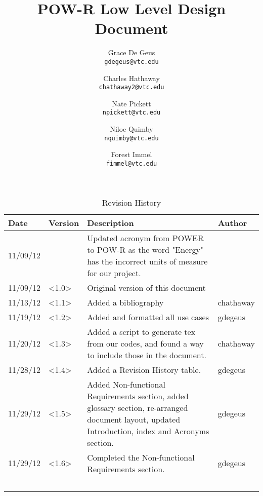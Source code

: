 \documentclass[titlepage]{report}
\begin{document}
\title{POW-R Low Level Design Document}
\author{
  Grace De Geus\\
  \texttt{gdegeus@vtc.edu}
  \and
  Charles Hathaway\\
  \texttt{chathaway2@vtc.edu}
  \and
  Nate Pickett\\
  \texttt{npickett@vtc.edu}
  \and
  Niloc Quimby\\
  \texttt{nquimby@vtc.edu}
  \and
  Forest Immel\\
  \texttt{fimmel@vtc.edu}
}
\maketitle



\setcounter{page}{1}


\begin{table}
\caption{Revision History}
    \begin{tabular}{|p{50pt}|p{50pt}|p{200pt}|p{50pt}|}
	\hline
	Date & Version & Description & Author\\  \hline
	11/09/12 & ~         &  Updated acronym from POWER to POW-R as the word "Energy" has the incorrect units of measure for our project. & ~      \\  \hline
	11/09/12 & <1.0> & Original version of this document & \\  \hline
	11/13/12 & <1.1> & Added a bibliography & chathaway\\  \hline
	11/19/12 & <1.2> & Added and formatted all use cases & gdegeus\\  \hline
	11/20/12 & <1.3> & Added a script to generate tex from our codes, and found a way to include those in the document. & chathaway\\  \hline
	11/28/12 & <1.4> & Added a Revision History table. & gdegeus \\ \hline
	11/29/12 & <1.5> & Added Non-functional Requirements section, added glossary section, re-arranged document layout, updated Introduction, index and Acronyms section. & gdegeus \\  \hline
	11/29/12 & <1.6> & Completed the Non-functional Requirements  section.  & gdegeus  \\  \hline
	~    & ~       & ~           & ~      \\  \hline
    \end{tabular}

\end{table}
\newpage
\end{document}
